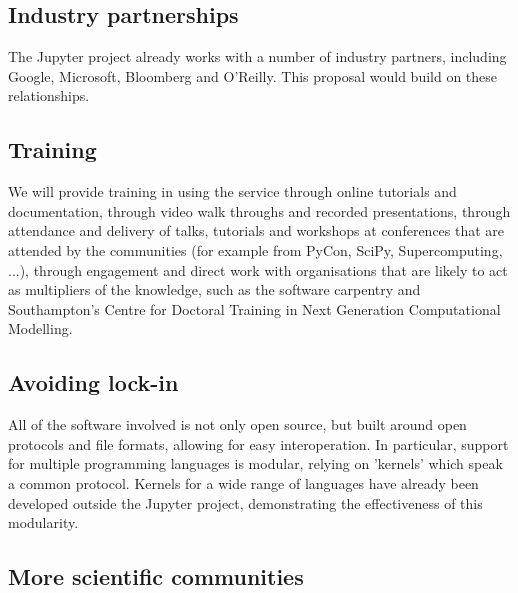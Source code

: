 \subsection{Industry partnerships}

The Jupyter project already works with a number of industry partners, including
Google, Microsoft, Bloomberg and O'Reilly. This proposal would build on these
relationships.


\subsection{Training}


We will provide training in using the service through online tutorials
and documentation, through video walk throughs and recorded
presentations, through attendance and delivery of talks, tutorials and
workshops at conferences that are attended by the communities (for
example from PyCon, SciPy, Supercomputing, ...), through engagement
and direct work with organisations that are likely to act as
multipliers of the knowledge, such as the software carpentry and
Southampton's Centre for Doctoral Training in Next Generation
Computational Modelling.



\subsection{Avoiding lock-in}

All of the software involved is not only open source, but built around open
protocols and file formats, allowing for easy interoperation. In particular,
support for multiple programming languages is modular, relying on 'kernels'
which speak a common protocol. Kernels for a wide range of languages have
already been developed outside the Jupyter project, demonstrating the
effectiveness of this modularity.


\subsection{More scientific communities}

